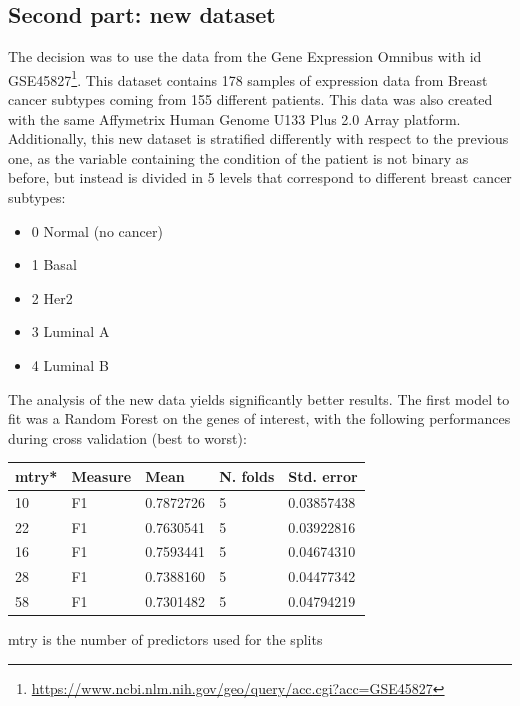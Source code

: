 \documentclass[journal]{IEEEtran}
\begin{document}
\subsection{Second part: new dataset}
The decision was to use the data from the Gene Expression Omnibus with id GSE45827\footnote{\url{https://www.ncbi.nlm.nih.gov/geo/query/acc.cgi?acc=GSE45827}}. This dataset contains 178 samples of expression data from Breast cancer subtypes coming from 155 different patients. This data was also created with the same Affymetrix Human Genome U133 Plus 2.0 Array platform.
Additionally, this new dataset is stratified differently with respect to the previous one, as the variable containing the condition of the patient is not binary as before, but instead is divided in 5 levels that correspond to different breast cancer subtypes:
\begin{itemize}
    \item 0 Normal (no cancer)
    \item 1 Basal 
    \item 2 Her2
    \item 3 Luminal A
    \item 4 Luminal B
\end{itemize}
The analysis of the new data yields significantly better results. The first model to fit was a Random Forest on the genes of interest, with the following performances during cross validation (best to worst):
\begin{table}[!ht]
    \begin{threeparttable}
    \centering
        \begin{tabularx}{\linewidth}{ X | X | X | X | X }
            \hline
            \textbf{mtry*} &
            \textbf{Measure} &  \textbf{Mean} & \textbf{N. folds} & \textbf{Std. error} \\ \hline
            10 & F1 & 0.7872726 & 5 & 0.03857438 \\
            22 & F1 & 0.7630541 & 5 & 0.03922816 \\
            16 & F1 & 0.7593441 & 5 & 0.04674310 \\
            28 & F1 & 0.7388160 & 5 & 0.04477342 \\
            58 & F1 & 0.7301482 & 5 & 0.04794219 \\
        \end{tabularx}
        \begin{tablenotes}
            \item *mtry is the number of predictors used for the splits
        \end{tablenotes}
     \end{threeparttable}
\end{table}
\end{document}
